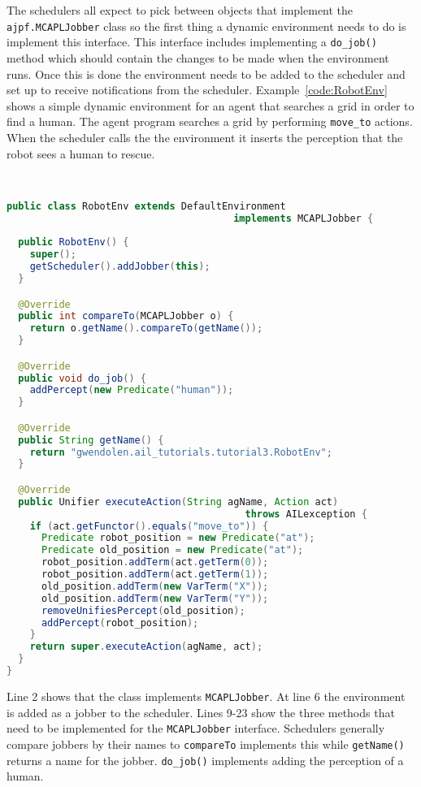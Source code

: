 \begin{sloppypar}
The schedulers all expect to pick between objects that implement the \texttt{ajpf.MCAPLJobber} class so the first thing a dynamic environment needs to do is implement this interface.  This interface includes implementing a \texttt{do\_job()} method which should contain the changes to be made when the environment runs.  Once this is done the environment needs to be added to the scheduler and set up to receive notifications from the scheduler.  Example~\ref{code:RobotEnv} shows a simple dynamic environment for an agent that searches a grid in order to find a human.  The agent program searches a grid by performing \lstinline{move_to} actions.  When the scheduler calls the the environment it inserts the perception that the robot sees a human to rescue.  
\end{sloppypar}
\begin{ourexample}
\label{code:RobotEnv} \quad \\
\begin{lstlisting}[basicstyle=\sffamily,language=Java,style=easslisting]
public class RobotEnv extends DefaultEnvironment
                                       implements MCAPLJobber {
	
  public RobotEnv() {
    super();
    getScheduler().addJobber(this);
  }

  @Override
  public int compareTo(MCAPLJobber o) {
    return o.getName().compareTo(getName());
  }

  @Override
  public void do_job() {
    addPercept(new Predicate("human"));
  }

  @Override
  public String getName() {
    return "gwendolen.ail_tutorials.tutorial3.RobotEnv";
  }   

  @Override
  public Unifier executeAction(String agName, Action act) 
                                         throws AILexception {
    if (act.getFunctor().equals("move_to")) {
      Predicate robot_position = new Predicate("at");
      Predicate old_position = new Predicate("at");
      robot_position.addTerm(act.getTerm(0));
      robot_position.addTerm(act.getTerm(1));
      old_position.addTerm(new VarTerm("X"));
      old_position.addTerm(new VarTerm("Y"));
      removeUnifiesPercept(old_position);
      addPercept(robot_position);
    }
    return super.executeAction(agName, act);
  }
}
\end{lstlisting}
\end{ourexample}
Line 2 shows that the class implements \texttt{MCAPLJobber}.  At line 6 the environment is added as a jobber to the scheduler.  Lines 9-23 show the three methods that need to be implemented for the \texttt{MCAPLJobber} interface.  Schedulers generally compare jobbers by their names to \texttt{compareTo} implements this while \texttt{getName()} returns a name for the jobber.  \texttt{do\_job()} implements adding the perception of a human.

